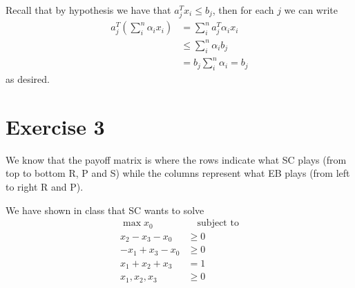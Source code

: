 \documentclass[12pt]{extarticle}
\numberwithin{equation}{section}
\begin{document}
Recall that by hypothesis we have that $a^T_j x_i \leq b_j$, then for each $j$ we can write
\begin{align}
	a^T_j \left(\sum_i^n \alpha_i x_i\right) & = \sum_i^n a_j^T \alpha_i x_i \\
	                                         & \leq \sum_i^n \alpha_i b_j    \\
	                                         & = b_j \sum_i^n \alpha_i = b_j
\end{align}
as desired.

\section*{Exercise 3}

We know that the payoff matrix is
where the rows indicate what SC plays (from top to bottom R, P and S)
while the columns represent what EB plays (from left to right R and P).

We have shown in class that SC wants to solve
\begin{align}
	\max             x_0 & \quad \text{subject to} \\
	x_2 - x_3 - x_0      & \geq 0                  \\
	-x_1 + x_3 - x_0     & \geq 0                  \\
	x_1 + x_2 + x_3      & = 1                     \\
	x_1, x_2, x_3        & \geq 0
\end{align}
\end{document}
